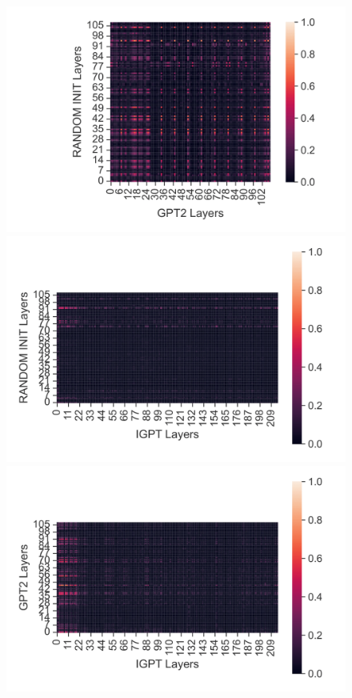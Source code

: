 \documentclass{article}
\begin{document}
\begin{figure}[H]
    \centering
    \begin{minipage}[b]{0.32\linewidth}
        \includegraphics[width=\linewidth]{figs/cka_40_40_dtgpt2_halfcheetah_medium_666_reward.png}
    \end{minipage}
    \begin{minipage}[b]{0.32\linewidth}
        \includegraphics[width=\linewidth]{figs/cka_40_40_dtigpt_halfcheetah_medium_666_reward.png}
    \end{minipage}
    \begin{minipage}[b]{0.32\linewidth}
        \includegraphics[width=\linewidth]{figs/cka_40_40_gpt2igpt_halfcheetah_medium_666_reward.png}

\end{minipage}
\end{figure}
\end{document}
